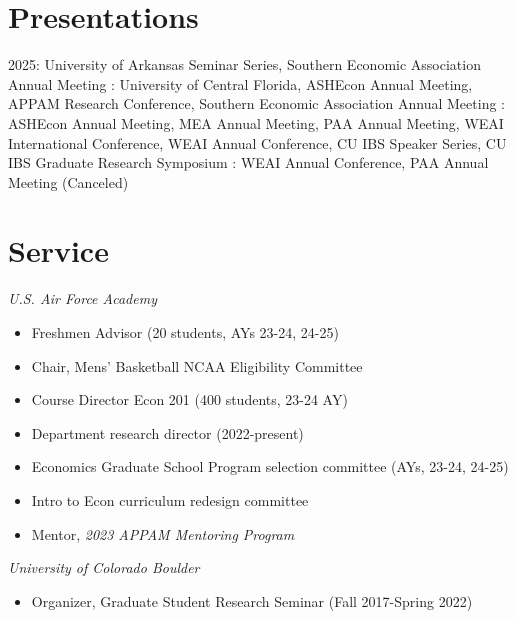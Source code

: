 \documentclass[letterpaper]{article}
\begin{document}
\section*{Presentations}
2025: University of Arkansas Seminar Series, Southern Economic Association Annual Meeting
\newline{}: University of Central Florida, ASHEcon Annual Meeting, APPAM Research Conference, Southern Economic Association Annual Meeting
\newline{}: ASHEcon Annual Meeting, MEA Annual Meeting, PAA Annual Meeting, WEAI International Conference, WEAI Annual Conference, CU IBS Speaker Series, CU IBS Graduate Research Symposium
\newline{}: WEAI Annual Conference, PAA Annual Meeting (Canceled)

\section*{Service}
\textit{U.S. Air Force Academy}
  \begin{itemize}[topsep=2pt,itemsep=-1pt,leftmargin=1em]
    \item[] Freshmen Advisor (20 students, AYs 23-24, 24-25)
    \item[] Chair, Mens' Basketball NCAA Eligibility Committee
    \item[] Course Director Econ 201 (400 students, 23-24 AY)
    \item[] Department research director (2022-present)
    \item[] Economics Graduate School Program selection committee (AYs, 23-24, 24-25)
    \item[] Intro to Econ curriculum redesign committee
    \item[] Mentor, \textit{2023 APPAM Mentoring Program}
  \end{itemize}
  \vspace*{.5em}
\textit{University of Colorado Boulder}
  \begin{itemize}[topsep=2pt,itemsep=-1pt,leftmargin=1em]
    \item[] Organizer, Graduate Student Research Seminar (Fall 2017-Spring 2022)
  \end{itemize}
\end{document}
